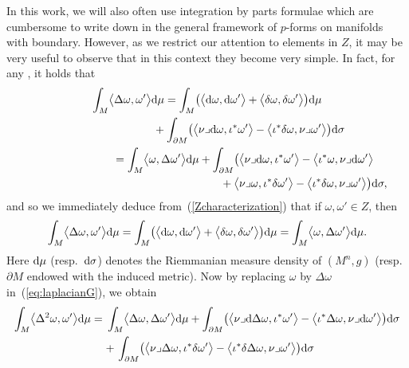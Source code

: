\documentclass[10pt,a4paper]{amsart}
\numberwithin{equation}{section}
\theoremstyle{definition}
\begin{document}
In this work, we will also often use integration by parts formulae which are cumbersome to write down in the general framework of $p$-forms on manifolds with boundary. However, as we restrict our attention to elements in $Z$, it may be very useful to observe that in this context they become very simple.
In fact, for any , it holds that
\begin{gather}
\int_M\bigl\langle\Delta\omega,\omega'\bigr\rangle {\rm d}\mu = \int_M\bigl(\bigl\langle {\rm d}\omega,{\rm d}\omega'\bigr\rangle +\bigl\langle\delta\omega,\delta\omega'\bigr\rangle\bigr) {\rm d}\mu \nonumber\\
\hphantom{\int_M\bigl\langle\Delta\omega,\omega'\bigr\rangle {\rm d}\mu =}{}
+\int_{\partial M}\bigl(\bigl\langle \nu\lrcorner {\rm d}\omega,\iota^*\omega'\bigr\rangle-\bigl\langle\iota^*\delta\omega,\nu\lrcorner\omega'\bigr\rangle\bigr) {\rm d}\sigma \label{eq:laplacianG1}\\
\hphantom{\int_M\bigl\langle\Delta\omega,\omega'\bigr\rangle {\rm d}\mu}{}
= \int_M\bigl\langle\omega,\Delta\omega'\bigr\rangle {\rm d}\mu + \int_{\partial M}\bigl(\bigl\langle\nu\lrcorner
{\rm d}\omega,\iota^*\omega'\bigr\rangle-\bigl\langle\iota^*\omega,\nu\lrcorner
{\rm d}\omega'\bigr\rangle
\nonumber\\
\hphantom{\int_M\bigl\langle\Delta\omega,\omega'\bigr\rangle {\rm d}\mu =\int_M\bigl\langle\omega,\Delta\omega'\bigr\rangle {\rm d}\mu + \int_{\partial M}}{}
+\bigl\langle\nu\lrcorner\omega,
\iota^*\delta\omega'\bigr\rangle-\bigl\langle\iota^*\delta\omega,
\nu\lrcorner\omega'\bigr\rangle\bigr){\rm d}\sigma,\label{eq:laplacianG}
\end{gather}
and so we immediately deduce from~(\ref{Zcharacterization}) that if $\omega,\omega'\in Z$, then
\begin{equation}\label{eq:laplacian}
\int_M\bigl\langle\Delta\omega,\omega'\bigr\rangle {\rm d}\mu=\int_M\bigl(\bigl\langle {\rm d}\omega,{\rm d}\omega'\bigr\rangle+\bigl\langle\delta\omega,\delta\omega'\bigr\rangle\bigr){\rm d}\mu=\int_M\bigl\langle\omega,\Delta\omega'\bigr\rangle {\rm d}\mu.
\end{equation}
Here ${\rm d}\mu$ (resp.\ ${\rm d}\sigma$) denotes the Riemmanian measure density of $(M^n,g)$ (resp.\ $\partial M$ endowed with the induced metric). Now by replacing $\omega$ by $\Delta \omega$ in~(\ref{eq:laplacianG}), we obtain
\begin{align}
\nonumber\int_M\bigl\langle\Delta^2\omega,\omega'\bigr\rangle {\rm d}\mu ={}& \int_M\bigl\langle\Delta \omega,\Delta\omega'\bigr\rangle {\rm d}\mu+\int_{\partial M}\bigl(\bigl\langle\nu\lrcorner {\rm d}\Delta\omega,\iota^*\omega'\bigr\rangle-\bigl\langle\iota^*\Delta\omega,\nu\lrcorner {\rm d}\omega'\bigr\rangle\bigr){\rm d}\sigma\\
 &{}{+}\,\int_{\partial M}\bigl(\bigl\langle\nu\lrcorner\Delta\omega,\iota^*\delta\omega'\bigr\rangle-\bigl\langle\iota^*\delta\Delta\omega,\nu\lrcorner\omega'\bigr\rangle\bigr){\rm d}\sigma\label{eq:partialintegDelta2omega}
\end{align}
\end{document}
